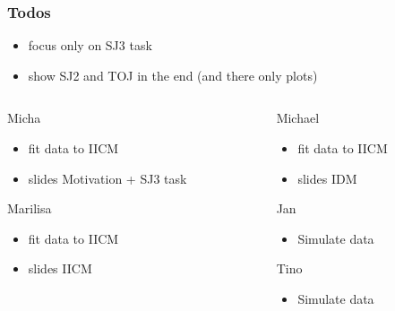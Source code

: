 \documentclass[xcolor={fixpdftex,hyperref,x11names},10pt,pdftex,hyperref={pdftex}]{beamer}
\begin{document}
\begin{frame}
  \frametitle{Todos}
  \begin{itemize}
      \item focus only on SJ3 task
      \item show SJ2 and TOJ in the end (and there only plots)
  \end{itemize}
  \begin{columns}[t]
      \begin{column}{0.5\textwidth}
  \begin{block}{Micha}
      \begin{itemize}
          \item fit data to IICM
          \item slides Motivation + SJ3 task
      \end{itemize}
  \end{block}
  \begin{block}{Marilisa}
      \begin{itemize}
          \item fit data to IICM
          \item slides IICM
      \end{itemize}
  \end{block}
      \end{column}
      \begin{column}{0.5\textwidth}
  \begin{block}{Michael}
      \begin{itemize}
          \item fit data to IICM
          \item slides IDM
      \end{itemize}
  \end{block}
  \begin{block}{Jan}
      \begin{itemize}
          \item Simulate data
      \end{itemize}
  \end{block}
  \begin{block}{Tino}
      \begin{itemize}
          \item Simulate data
      \end{itemize}
  \end{block}
    \end{column}
  \end{columns}
\end{frame}
\end{document}
